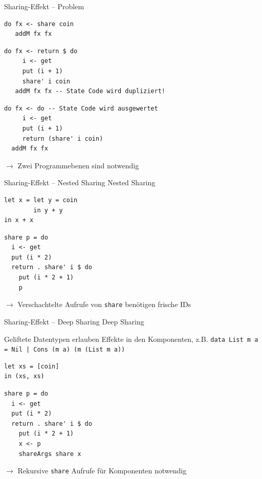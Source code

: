\documentclass{beamer}
\newcommand{\haskellinline}[1]{\texttt{#1}}
\begin{document}
\begin{frame}[fragile]{Sharing-Effekt -- Problem}
\begin{verbatim}
do fx <- share coin
   addM fx fx
\end{verbatim}

\begin{verbatim}
do fx <- return $ do
     i <- get
     put (i + 1)
     share' i coin
   addM fx fx -- State Code wird dupliziert!
\end{verbatim}
\pause
\begin{verbatim}
do fx <- do -- State Code wird ausgewertet
     i <- get
     put (i + 1)
     return (share' i coin)
  addM fx fx
\end{verbatim}
$\rightarrow$ Zwei Programmebenen sind notwendig
\end{frame}

\begin{frame}[fragile]{Sharing-Effekt -- Nested Sharing}
\alert{Nested Sharing}

\begin{minipage}[t]{0.48\linewidth}
\begin{verbatim}
let x = let y = coin
        in y + y
in x + x
\end{verbatim}
\end{minipage}
\begin{minipage}[t]{0.48\linewidth}
\begin{verbatim}
share p = do
  i <- get
  put (i * 2)
  return . share' i $ do
    put (i * 2 + 1)
    p
\end{verbatim}
\end{minipage}
\vfill
$\rightarrow$ Verschachtelte Aufrufe von \haskellinline{share} benötigen frische IDs
\end{frame}

\begin{frame}[fragile]{Sharing-Effekt -- Deep Sharing}
\alert{Deep Sharing}

Geliftete Datentypen erlauben Effekte in den Komponenten, z.B.
  \haskellinline{data List m a = Nil | Cons (m a) (m (List m a))}

\vfill
\begin{minipage}[t]{0.48\linewidth}
\begin{verbatim}
let xs = [coin]
in (xs, xs)
\end{verbatim}
\end{minipage}
\begin{minipage}[t]{0.48\linewidth}
\begin{verbatim}
share p = do
  i <- get
  put (i * 2)
  return . share' i $ do
    put (i * 2 + 1)
    x <- p
    shareArgs share x
\end{verbatim}
\end{minipage}

$\rightarrow$ Rekursive \haskellinline{share} Aufrufe für Komponenten notwendig
\end{frame}
\end{document}
